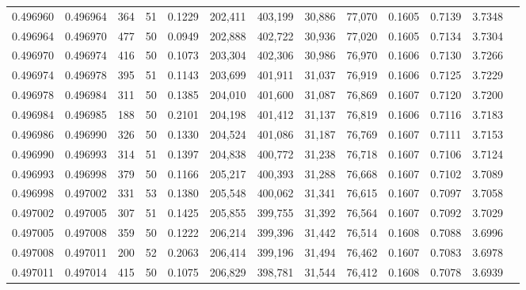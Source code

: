 \begin{tabular}{rrrrrrrrrrrrr}
0.496960 & 0.496964 & 364 &  51 &                                     0.1229 & 202,411 & 403,199 &  30,886 &  77,070 & 0.1605 & 0.7139 & 3.7348 \\
0.496964 & 0.496970 & 477 &  50 &                                     0.0949 & 202,888 & 402,722 &  30,936 &  77,020 & 0.1605 & 0.7134 & 3.7304 \\
0.496970 & 0.496974 & 416 &  50 &                                     0.1073 & 203,304 & 402,306 &  30,986 &  76,970 & 0.1606 & 0.7130 & 3.7266 \\
0.496974 & 0.496978 & 395 &  51 &                                     0.1143 & 203,699 & 401,911 &  31,037 &  76,919 & 0.1606 & 0.7125 & 3.7229 \\
0.496978 & 0.496984 & 311 &  50 &                                     0.1385 & 204,010 & 401,600 &  31,087 &  76,869 & 0.1607 & 0.7120 & 3.7200 \\
0.496984 & 0.496985 & 188 &  50 &                                     0.2101 & 204,198 & 401,412 &  31,137 &  76,819 & 0.1606 & 0.7116 & 3.7183 \\
0.496986 & 0.496990 & 326 &  50 &                                     0.1330 & 204,524 & 401,086 &  31,187 &  76,769 & 0.1607 & 0.7111 & 3.7153 \\
0.496990 & 0.496993 & 314 &  51 &                                     0.1397 & 204,838 & 400,772 &  31,238 &  76,718 & 0.1607 & 0.7106 & 3.7124 \\
0.496993 & 0.496998 & 379 &  50 &                                     0.1166 & 205,217 & 400,393 &  31,288 &  76,668 & 0.1607 & 0.7102 & 3.7089 \\
0.496998 & 0.497002 & 331 &  53 &                                     0.1380 & 205,548 & 400,062 &  31,341 &  76,615 & 0.1607 & 0.7097 & 3.7058 \\
0.497002 & 0.497005 & 307 &  51 &                                     0.1425 & 205,855 & 399,755 &  31,392 &  76,564 & 0.1607 & 0.7092 & 3.7029 \\
0.497005 & 0.497008 & 359 &  50 &                                     0.1222 & 206,214 & 399,396 &  31,442 &  76,514 & 0.1608 & 0.7088 & 3.6996 \\
0.497008 & 0.497011 & 200 &  52 &                                     0.2063 & 206,414 & 399,196 &  31,494 &  76,462 & 0.1607 & 0.7083 & 3.6978 \\
0.497011 & 0.497014 & 415 &  50 &                                     0.1075 & 206,829 & 398,781 &  31,544 &  76,412 & 0.1608 & 0.7078 & 3.6939 \\

\end{tabular}
